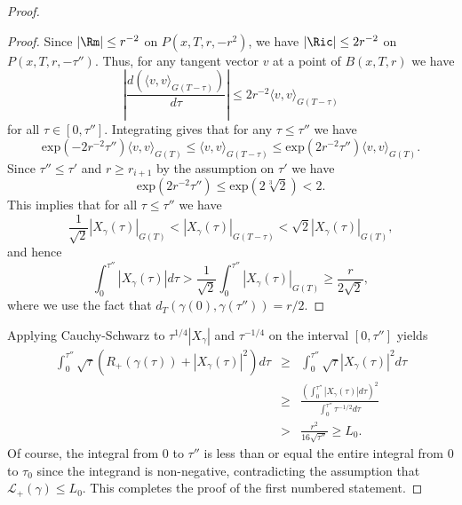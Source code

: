 \begin{proof}
\begin{proof}
Since $|\Rm|\le r^{-2}$ on $P(x,T,r,-r^2)$, we have $|\Ric|\le
2r^{-2}$ on $P(x,T,r,-\tau'')$. Thus, for any tangent vector $v$ at
a point of $B(x,T,r)$ we have
$$\left|\frac{d(\langle v,v\rangle_{G(T-\tau)})}{d\tau}\right|\le 2r^{-2}\langle v,v\rangle_{G(T-\tau)}$$
for all
$\tau\in [0,\tau'']$. Integrating gives that for any $\tau\le
\tau''$ we have
$$\mathrm{exp}(-2r^{-2}\tau'')\langle v,v\rangle_{G(T)}\le \langle
v,v\rangle_{G(T-\tau)} \le \mathrm{exp}(2r^{-2}\tau'')\langle
v,v\rangle_{G(T)}.$$ Since  $\tau''\le \tau'$ and $r\ge r_{i+1}$ by
the assumption on $\tau'$ we have
$$\mathrm{exp}(2r^{-2}\tau'')\le \mathrm{exp}(2\sqrt[3]{2})< 2.$$ This
implies that for all $\tau\le \tau''$ we have
$$\frac{1}{\sqrt{2}}| X_\gamma(\tau)|_{G(T)}<
|X_\gamma(\tau)|_{G(T-\tau)}<\sqrt{2}|X_\gamma(\tau)|_{G(T)},$$
and hence
$$\int_0^{\tau''}|X_\gamma(\tau)|d\tau>
\frac{1}{\sqrt{2}}\int_0^{\tau''}|X_\gamma(\tau)|_{G(T)}\ge
\frac{r}{2\sqrt{2}},$$ where we use the fact that
$d_T(\gamma(0),\gamma(\tau''))=r/2$.
\end{proof}

Applying Cauchy-Schwarz to $\tau^{1/4}|X_\gamma|$ and $\tau^{-1/4}$ on the
interval $[0,\tau'']$ yields
\begin{eqnarray*}\int_0^{\tau''}\sqrt{\tau}\left(R_+(\gamma(\tau))+|X_\gamma(\tau)|^2\right)d\tau &
\ge & \int_0^{\tau''}\sqrt{\tau}|X_\gamma(\tau)|^2d\tau
\\
& \ge &
\frac{\left(\int_0^{\tau''}|X_\gamma(\tau)|d\tau\right)^2}{\int_0^{\tau''}\tau^{-1/2}d\tau}
\\ & > &
\frac{r^2}{16\sqrt{\tau''}}\ge L_0.
\end{eqnarray*}
Of course, the integral from $0$ to $\tau''$ is less than or equal
the entire integral from $0$ to $\tau_0$ since the integrand is
non-negative, contradicting the assumption that ${\mathcal
L}_+(\gamma)\le L_0$. This completes the proof of the first
numbered statement.



\end{proof}
